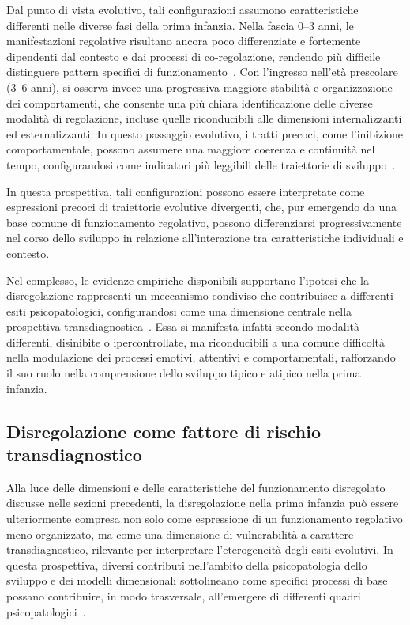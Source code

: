             Dal punto di vista evolutivo, tali configurazioni assumono caratteristiche differenti nelle diverse fasi della prima infanzia. Nella fascia 0--3 anni, le manifestazioni regolative risultano ancora poco differenziate e fortemente dipendenti dal contesto e dai processi di co-regolazione, rendendo più difficile distinguere pattern specifici di funzionamento~\cite{calkins2007hill,cole2004}. Con l'ingresso nell'età prescolare (3--6 anni), si osserva invece una progressiva maggiore stabilità e organizzazione dei comportamenti, che consente una più chiara identificazione delle diverse modalità di regolazione, incluse quelle riconducibili alle dimensioni internalizzanti ed esternalizzanti. In questo passaggio evolutivo, i tratti precoci, come l'inibizione comportamentale, possono assumere una maggiore coerenza e continuità nel tempo, configurandosi come indicatori più leggibili delle traiettorie di sviluppo~\cite{cicchetti2002,sroufe2005}.

            In questa prospettiva, tali configurazioni possono essere interpretate come espressioni precoci di traiettorie evolutive divergenti, che, pur emergendo da una base comune di funzionamento regolativo, possono differenziarsi progressivamente nel corso dello sviluppo in relazione all'interazione tra caratteristiche individuali e contesto.

            Nel complesso, le evidenze empiriche disponibili supportano l'ipotesi che la disregolazione rappresenti un meccanismo condiviso che contribuisce a differenti esiti psicopatologici, configurandosi come una dimensione centrale nella prospettiva transdiagnostica~\cite{beauchaine2019,astle2022}. Essa si manifesta infatti secondo modalità differenti, disinibite o ipercontrollate, ma riconducibili a una comune difficoltà nella modulazione dei processi emotivi, attentivi e comportamentali, rafforzando il suo ruolo nella comprensione dello sviluppo tipico e atipico nella prima infanzia.

        \subsection{Disregolazione come fattore di rischio transdiagnostico}
        \label{sec:2_3_4}

            Alla luce delle dimensioni e delle caratteristiche del funzionamento disregolato discusse nelle sezioni precedenti, la disregolazione nella prima infanzia può essere ulteriormente compresa non solo come espressione di un funzionamento regolativo meno organizzato, ma come una dimensione di vulnerabilità a carattere transdiagnostico, rilevante per interpretare l'eterogeneità degli esiti evolutivi. In questa prospettiva, diversi contributi nell'ambito della psicopatologia dello sviluppo e dei modelli dimensionali sottolineano come specifici processi di base possano contribuire, in modo trasversale, all'emergere di differenti quadri psicopatologici~\cite{astle2022,beauchaine2019}.


